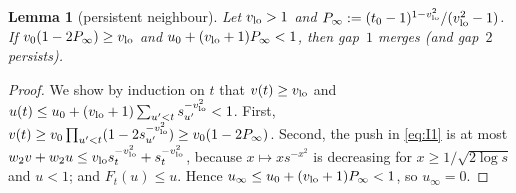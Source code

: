 \documentclass[11pt]{article}
\newtheorem{lemma}[theorem]{Lemma}
\theoremstyle{definition}
\theoremstyle{remark}
\begin{document}
\begin{lemma}[persistent neighbour]\label{lem:winV}
Let $v_{\rm lo}>1$ and $P_\infty:=(t_0-1)^{1-v_{\rm lo}^2}/(v_{\rm lo}^2-1)$. If $v_0(1-2P_\infty)\ge v_{\rm lo}$ and
$u_0+(v_{\rm lo}+1)P_\infty<1$, then gap~$1$ merges (and gap~$2$ persists).
\end{lemma}
\begin{proof}
We show by induction on $t$ that $v(t)\ge v_{\rm lo}$ and $u(t)\le u_0+(v_{\rm lo}+1)\sum_{u'<t}s_{u'}^{-v_{\rm lo}^2}<1$.
First, $v(t)\ge v_0\prod_{u'<t}(1-2s_{u'}^{-v_{\rm lo}^2})\ge v_0(1-2P_\infty)$. Second, the push in \eqref{eq:I1} is at most
$w_2v+w_2u\le v_{\rm lo}s_t^{-v_{\rm lo}^2}+s_t^{-v_{\rm lo}^2}$, because $x\mapsto xs^{-x^2}$ is decreasing for
$x\ge1/\sqrt{2\log s}$ and $u<1$; and $F_t(u)\le u$. Hence $u_\infty\le u_0+(v_{\rm lo}+1)P_\infty<1$, so $u_\infty=0$.
\end{proof}
\end{document}
